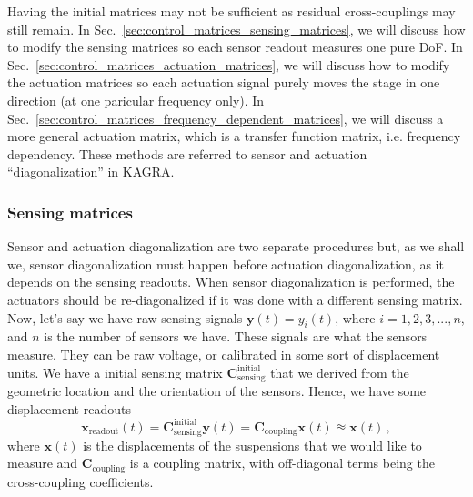 Having the initial matrices may not be sufficient as residual cross-couplings may still remain.
In Sec.~\ref{sec:control_matrices_sensing_matrices}, we will discuss how to modify the sensing matrices so each sensor readout measures one pure DoF.
In Sec.~\ref{sec:control_matrices_actuation_matrices}, we will discuss how to modify the actuation matrices so each actuation signal purely moves the stage in one direction (at one paricular frequency only).
In Sec.~\ref{sec:control_matrices_frequency_dependent_matrices}, we will discuss a more general actuation matrix, which is a transfer function matrix, i.e. frequency dependency.
These methods are referred to sensor and actuation ``diagonalization'' in KAGRA.


\subsubsection{Sensing matrices \label{sec:control_matrices_sensing_matrices}}
Sensor and actuation diagonalization are two separate procedures but, as we shall we, sensor diagonalization must happen before actuation diagonalization, as it depends on the sensing readouts.
When sensor diagonalization is performed, the actuators should be re-diagonalized if it was done with a different sensing matrix.
Now, let's say we have raw sensing signals $\mathbf{y}(t)=y_i(t)$, where $i=1,2,3,...,n$, and $n$ is the number of sensors we have.
These signals are what the sensors measure.
They can be raw voltage, or calibrated in some sort of displacement units.
We have a initial sensing matrix $\mathbf{C}_\mathrm{sensing}^\mathrm{initial}$ that we derived from the geometric location and the orientation of the sensors.
Hence, we have some displacement readouts
\begin{equation}
	\mathbf{x}_\mathrm{readout}(t)=\mathbf{C}_\mathrm{sensing}^\mathrm{initial}\mathbf{y}(t)=\mathbf{C}_\mathrm{coupling}\mathbf{x}(t)\approxeq\mathbf{x}(t)\,,
\end{equation}
where $\mathbf{x}(t)$ is the displacements of the suspensions that we would like to measure and $\mathbf{C}_\mathrm{coupling}$ is a coupling matrix, with off-diagonal terms being the cross-coupling coefficients.

